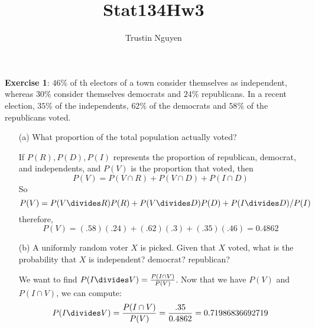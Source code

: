 \documentclass{article}
\title{Stat134Hw3}
\author{Trustin Nguyen}
\begin{document}
    \maketitle

\reversemarginpar

\textbf{Exercise 1}: $46\%$ of th electors of a town consider themselves as independent, whereas $30\%$ consider themselves democrats and $24\%$ republicans. In a recent election, $35\%$ of the independents, $62\%$ of the democrats and $58\%$ of the republicans voted. 
    \begin{itemize}
        \item [(a)] What proportion of the total population actually voted?
            \begin{answer}
                If $P(R), P(D), P(I)$ represents the proportion of republican, democrat, and independents, and $P(V)$ is the proportion that voted, then 
                    \begin{equation*}
                        P(V) = P(V \cap R) + P(V \cap D) + P(I \cap D)
                    \end{equation*}
                So 
                    \begin{equation*}
                        P(V) = P(V \divides R)P(R) + P(V \divides D)P(D) + P(I \divides D)/P(I)
                    \end{equation*}
                therefore,
                    \begin{equation*}
                        P(V) = (.58)(.24) + (.62)(.3) + (.35)(.46) = 0.4862
                    \end{equation*}
            \end{answer}

        \item [(b)] A uniformly random voter $X$ is picked. Given that $X$ voted, what is the probability that $X$ is independent? democrat? republican? 
            \begin{answer}
                We want to find $P(I \divides V) = \frac{P(I \cap V)}{P(V)}$. Now that we have $P(V)$ and $P(I \cap V)$, we can compute:
                    \begin{equation*}
                        P(I \divides V) = \dfrac{P(I \cap V)}{P(V)} = \dfrac{.35}{0.4862} = 0.71986836692719
                    \end{equation*}
            \end{answer}
    \end{itemize}
\end{document}
